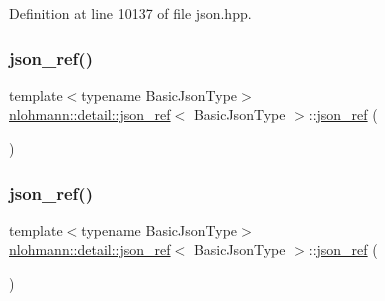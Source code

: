 Definition at line 10137 of file json.\+hpp.

\mbox{\label{classnlohmann_1_1detail_1_1json__ref_a59221ddbd756ca24d289c787fab38dbc}} 
\subsubsection{\texorpdfstring{json\+\_\+ref()}{json\_ref()}\hspace{0.1cm}{\footnotesize\ttfamily [5/6]}}
{\footnotesize\ttfamily template$<$typename Basic\+Json\+Type$>$ \\
\hyperlink{classnlohmann_1_1detail_1_1json__ref}{nlohmann\+::detail\+::json\+\_\+ref}$<$ Basic\+Json\+Type $>$\+::\hyperlink{classnlohmann_1_1detail_1_1json__ref}{json\+\_\+ref} (\begin{DoxyParamCaption}\item[{\hyperlink{classnlohmann_1_1detail_1_1json__ref}{json\+\_\+ref}$<$ Basic\+Json\+Type $>$ \&\&}]{ }\end{DoxyParamCaption})\hspace{0.3cm}{\ttfamily [default]}}

\mbox{\label{classnlohmann_1_1detail_1_1json__ref_a4c68db46934e03588bbd73b00147c0dd}} 
\subsubsection{\texorpdfstring{json\+\_\+ref()}{json\_ref()}\hspace{0.1cm}{\footnotesize\ttfamily [6/6]}}
{\footnotesize\ttfamily template$<$typename Basic\+Json\+Type$>$ \\
\hyperlink{classnlohmann_1_1detail_1_1json__ref}{nlohmann\+::detail\+::json\+\_\+ref}$<$ Basic\+Json\+Type $>$\+::\hyperlink{classnlohmann_1_1detail_1_1json__ref}{json\+\_\+ref} (\begin{DoxyParamCaption}\item[{const \hyperlink{classnlohmann_1_1detail_1_1json__ref}{json\+\_\+ref}$<$ Basic\+Json\+Type $>$ \&}]{ }\end{DoxyParamCaption})\hspace{0.3cm}{\ttfamily [delete]}}



